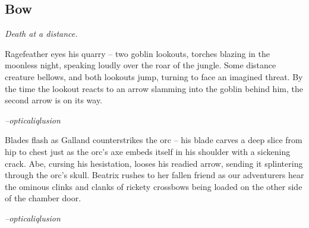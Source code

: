 \subsection{Bow}
\textit{Death at a distance.}

\begin{quotebox}
Ragefeather eyes his quarry -- two goblin lookouts, torches blazing in the moonless night, speaking loudly over the roar of the jungle. Some distance creature bellows, and both lookouts jump, turning to face an imagined threat. By the time the lookout reacts to an arrow slamming into the goblin behind him, the second arrow is on its way.

\textit{--opticaliqlusion}
\end{quotebox}

\begin{quotebox}
Blades flash as Galland counterstrikes the orc -- his blade carves a deep slice from hip to chest just as the orc's axe embeds itself in his shoulder with a sickening crack. Abe, cursing his hesistation, looses his readied arrow, sending it splintering through the orc's skull. Beatrix rushes to her fallen friend as our adventurers hear the ominous clinks and clanks of rickety crossbows being loaded on the other side of the chamber door.

\textit{--opticaliqlusion}
\end{quotebox}

